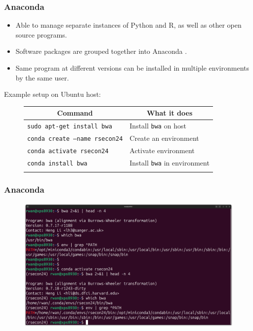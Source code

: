 \documentclass[11pt,aspectratio=43,ignorenonframetext,t]{beamer}
\begin{document}
\begin{frame}

\frametitle{Anaconda}

\begin{itemize}
  \item Able to manage separate instances of Python and R, as well as other open source programs.
  \item Software packages are grouped together into Anaconda {}.
  \item Same program at different versions can be installed in multiple environments by the same user.
\end{itemize}
\vs

Example setup on Ubuntu host:
\begin{figure}
  \centering
  \begin{tabular}{ll}
    \hline
    \multicolumn{1}{c}{Command} & \multicolumn{1}{c}{What it does} \\
    \hline
    {\texttt{sudo apt-get install bwa}} & Install {\texttt{bwa}} on host \\
    \arrayrulecolor{red}\hline
    {\texttt{conda create --name rsecon24}} & Create an environment \\
    {\texttt{conda activate rsecon24}} & Activate environment \\
    {\texttt{conda install bwa}}       & Install {\texttt{bwa}} in environment \\
    \arrayrulecolor{black}\hline
  \end{tabular}
\end{figure}

\end{frame}


\begin{frame}

\frametitle{Anaconda}

\begin{figure}
  \centering
  \includegraphics[width=\textwidth]{screencaps/anaconda}
\end{figure}

\end{frame}
\end{document}
